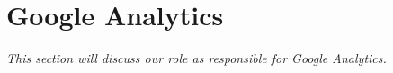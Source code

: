 \section{Google Analytics} \label{Roles_SecAnalytics}
\textit{This section will discuss our role as responsible for Google Analytics.}